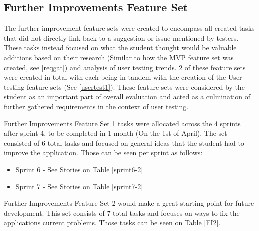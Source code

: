 \subsection{Further Improvements Feature Set}
The further improvement feature sets were created to encompass all created tasks that did not directly link back to a suggestion or issue mentioned by testers. These tasks instead focused on what the student thought would be valuable additions based on their research (Similar to how the MVP feature set was created, see \ref{reqgat}) and analysis of user testing trends. 2 of these feature sets were created in total with each being in tandem with the creation of the User testing feature sets (See \ref{usertest1}). These feature sets were considered by the student as an important part of overall evaluation and acted as a culmination of further gathered requirements in the context of user testing.

Further Improvements Feature Set 1 tasks were allocated across the 4 sprints after sprint 4, to be completed in 1 month (On the 1st of April). The set consisted of 6 total tasks and focused on general ideas that the student had to improve the application. Those can be seen per sprint as follows:

\begin{itemize}
    \item Sprint 6 - See Stories on Table \ref{sprint6-2}
    \item Sprint 7 - See Stories on Table \ref{sprint7-2}
\end{itemize}

Further Improvements Feature Set 2 would make a great starting point for future development. This set consists of 7 total tasks and focuses on ways to fix the applications current problems. Those tasks can be seen on Table \ref{FI2}.